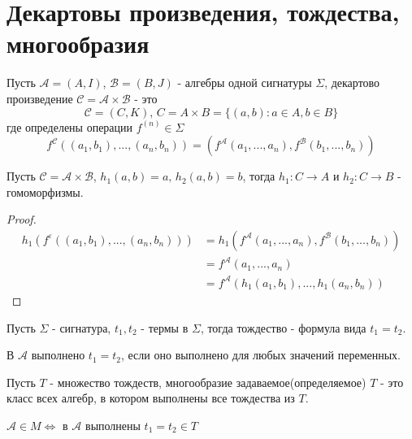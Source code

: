 \documentclass[../main/document.tex]{subfiles}
\begin{document}
\section{Декартовы произведения, тождества, многообразия}
\begin{dfn}
Пусть $\mathcal{A}=(A,I)$, $\mathcal{B}=(B,J)$ - алгебры одной сигнатуры $\Sigma$, декартово произведение $\mathcal{C}=\mathcal{A}\times \mathcal{B}$ - это
$$\mathcal{C}=(C,K),\, C=A\times B=\{(a,b):a\in A,b\in B\}$$
где определены операции $f^{(n)}\in \Sigma$
$$f^{\mathcal{C}}((a_1,b_1),...,(a_n,b_n))=(f^{\mathcal{A}}(a_1,...,a_n),f^{\mathcal{B}}(b_1,...,b_n))$$
\end{dfn}
\begin{exm}

\end{exm}
\begin{thm}
Пусть $\mathcal{C}=\mathcal{A}\times \mathcal{B}$, $h_1(a,b)=a,\,h_2(a,b)=b$, тогда $h_1:C\to A$ и $h_2:C\to B$ - гомоморфизмы.
\begin{proof}
\begin{align*}
h_1(f^{\varepsilon}((a_1,b_1),...,(a_n,b_n)))&=h_1(f^{\mathcal{A}}(a_1,...,a_n),f^{\mathcal{B}}(b_1,...,b_n))\\
&=f^{\mathcal{A}}(a_1,...,a_n)\\
&=f^{\mathcal{A}}(h_1(a_1,b_1),...,h_1(a_n,b_n))
\end{align*}
\end{proof}
\end{thm}
\begin{dfn}[Тождество]
Пусть $\Sigma$ - сигнатура, $t_1,t_2$ - термы в $\Sigma$, тогда тождество - формула вида $t_1=t_2$.

В $\mathcal{A}$ выполнено $t_1=t_2$, если оно выполнено для любых значений переменных.
\end{dfn}
\begin{dfn}[Многообразие]
Пусть $T$ - множество тождеств, многообразие задаваемое(определяемое) $T$ - это класс всех алгебр, в котором выполнены все тождества из $T$.

$\mathcal{A}\in M\Leftrightarrow$ в $\mathcal{A}$ выполнены $t_1=t_2\in T$
\end{dfn}
\begin{exm}

\end{exm}
\end{document}

